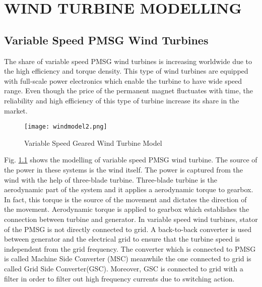 \chapter{WIND TURBINE MODELLING}
\label{chp:3}
\section{Variable Speed PMSG Wind Turbines}
The share of variable speed PMSG wind turbines is increasing worldwide due to the high efficiency and torque density. This type of wind turbines are equipped with full-scale power electronics which enable the turbine to have wide speed range. Even though the price of the permanent magnet fluctuates with time, the reliability and high efficiency of this type of turbine increase its share in the market.\par
 \begin{figure}[h!]
	\centering
	\texttt{[image: windmodel2.png]}
	\caption{Variable Speed Geared Wind Turbine Model}
	\label{varspeedpmsg}
\end{figure} 
Fig. \ref{varspeedpmsg} shows the modelling of variable speed PMSG wind turbine. The source of the power in these systems is the wind itself. The power is captured from the wind with the help of three-blade turbine. Three-blade turbine is the aerodynamic part of the system and it applies a aerodynamic torque to gearbox. In fact, this torque is the source of the movement and dictates the direction of the movement. Aerodynamic torque is applied to gearbox which establishes the connection between turbine and generator. In variable speed wind turbines, stator of the PMSG is not directly connected to grid. A back-to-back converter is used between generator and the electrical grid to ensure that the turbine speed is independent from the grid frequency. The converter which is connected to PMSG is called Machine Side Converter (MSC) meanwhile the one connected to grid is called Grid Side Converter(GSC). Moreover, GSC is connected to grid with a filter in order to filter out high frequency currents due to switching action. 
